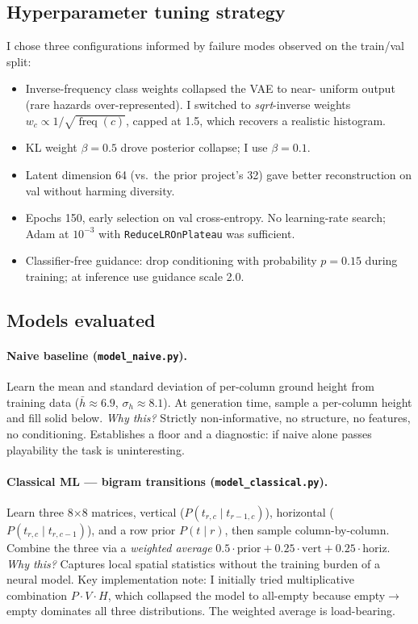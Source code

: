 \documentclass[11pt]{article}
\begin{document}
\subsection{Hyperparameter tuning strategy}
I chose three configurations informed by failure modes
observed on the train/val split:
\begin{itemize}
    \item Inverse-frequency class weights collapsed the VAE to near-
    uniform output (rare hazards over-represented). I switched to
    \emph{sqrt}-inverse weights
    $w_c \propto 1/\sqrt{\operatorname{freq}(c)}$, capped at 1.5, which
    recovers a realistic histogram.
    \item KL weight $\beta = 0.5$ drove posterior collapse; I use
    $\beta = 0.1$.
    \item Latent dimension 64 (vs.\ the prior project's 32) gave
    better reconstruction on val without harming diversity.
    \item Epochs 150, early selection on val cross-entropy. No
    learning-rate search; Adam at $10^{-3}$ with
    \texttt{ReduceLROnPlateau} was sufficient.
    \item Classifier-free guidance: drop conditioning with probability
    $p=0.15$ during training; at inference use guidance scale 2.0.
\end{itemize}

\subsection{Models evaluated}

\paragraph{Naive baseline (\texttt{model\_naive.py}).}
Learn the mean and standard deviation of per-column ground height from
training data ($\bar{h} \approx 6.9$, $\sigma_h \approx 8.1$). At
generation time, sample a per-column height and fill solid below.
\emph{Why this?} Strictly non-informative, no structure, no
features, no conditioning. Establishes a floor and a diagnostic: if
naive alone passes playability the task is uninteresting.

\paragraph{Classical ML --- bigram transitions (\texttt{model\_classical.py}).}
Learn three 8$\times$8 matrices, vertical ($P(t_{r,c}\mid t_{r-1,c})$),
horizontal ($P(t_{r,c}\mid t_{r,c-1})$), and a row prior $P(t\mid r)$,
then sample column-by-column. Combine the three via a
\emph{weighted average}
$0.5 \cdot \text{prior} + 0.25 \cdot \text{vert} + 0.25 \cdot \text{horiz}$.
\emph{Why this?} Captures local spatial statistics without the training
burden of a neural model. Key implementation note: I initially tried
multiplicative combination $P \cdot V \cdot H$, which collapsed the
model to all-empty because empty$\to$empty dominates all three
distributions. The weighted average is load-bearing.
\end{document}
